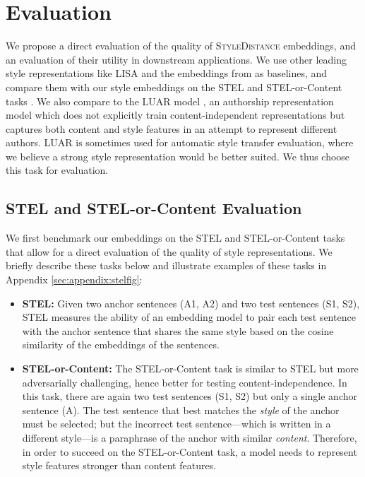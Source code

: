 \section{Evaluation}
\label{sec:evaluation}

We propose a direct evaluation of the quality of \textsc{StyleDistance} embeddings, and an evaluation of their utility in downstream applications. We use other leading style representations like LISA \citep{lisa} and the embeddings from \citet{styleemb} as baselines, and compare them with our style embeddings on the STEL and STEL-or-Content tasks \citep{stel,styleemb}. We also compare to the LUAR model \citep{luar}, an authorship representation model which does not explicitly train content-independent representations but captures both content and style features in an attempt to represent different authors. LUAR is sometimes used for automatic style transfer evaluation, where we believe a strong style representation would be better suited. We thus choose this task for evaluation. %

\subsection{STEL and STEL-or-Content Evaluation}
\label{sec:steleval}


We first benchmark our embeddings on the STEL and STEL-or-Content tasks that allow for a direct evaluation of the quality of style representations. We briefly describe these tasks below and illustrate examples of these tasks in Appendix \ref{sec:appendix:stelfig}:

\begin{itemize}

\item \textbf{STEL:} Given two anchor sentences (A1, A2) and two test sentences (S1, S2), STEL measures the ability of an embedding model to pair each test sentence with the anchor sentence that shares the same style based on the cosine similarity of the embeddings of the sentences.

\item \textbf{STEL-or-Content:} The STEL-or-Content task is similar to STEL but more adversarially challenging, hence  better for testing content-independence. In this task, there are again two test sentences (S1, S2) but only a single anchor sentence (A). The test sentence that best matches the \emph{style} of the anchor must be selected; but the incorrect test sentence---which is written in a different style---is a  paraphrase of the anchor with similar \emph{content}. Therefore, in order to succeed on the STEL-or-Content task, a model needs to represent style features stronger than content features.

\end{itemize}



